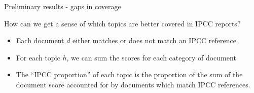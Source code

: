\documentclass[9pt]{beamer}
\begin{document}
%
%
%
%
%

\begin{frame}{Preliminary results - gaps in coverage}

How can we get a sense of which topics are better covered in IPCC reports?

\begin{itemize}
	\item Each document \(d\) either matches or does not match an IPCC reference
	\item For each topic \(h\), we can sum the scores for each category of document
	\item The ``IPCC proportion'' of each topic is the proportion of the sum of the document score accounted for by documents which match IPCC references.
\end{itemize}



\end{frame}
\end{document}

